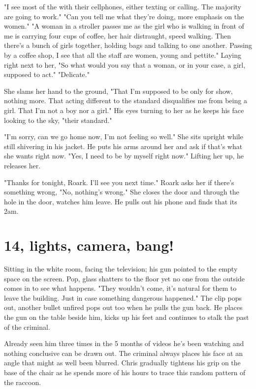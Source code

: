        "I see most of the with their cellphones, either texting or calling. The majority are going to work." "Can you tell me what they're doing,
    more emphasis on the women." "A woman in a stroller passes me as the girl who is walking in front of me is carrying four cups of coffee,
    her hair distraught, speed walking. Then there's a bunch of girls together, holding bags and talking to one another. Passing by a coffee
    shop, I see that all the staff are women, young and pettite." Laying right next to her, "So what would you say that a woman, or in your
    case, a girl, supposed to act." "Delicate." 

        She slams her hand to the ground, "That I'm supposed to be only for show, nothing more. That acting different to the standard
    disqualifies me from being a girl. That I'm not a boy nor a girl." His eyes turning to her as he keeps his face looking to the sky, "their
    standard."

        "I'm sorry, can we go home now, I'm not feeling so well." She sits upright while still shivering in his jacket. He puts his arms around
    her and ask if that's what she wants right now. "Yes, I need to be by myself right now." Lifting her up, he releases her.

        "Thanks for tonight, Roark. I'll see you next time." Roark asks her if there's something wrong, "No, nothing's wrong." She closes the 
    door and through the hole in the door, watches him leave. He pulls out his phone and finds that its 2am. 

\section{14, lights, camera, bang!}

        Sitting in the white room, facing the television; his gun pointed to the empty space on the screen. Pop, glass shatters to the floor yet
    no one from the outside comes in to see what happens. "They wouldn't come, it's natural for them to leave the building. Just in case 
    something dangerous happened." The clip pops out, another bullet unfired pops out too when he pulls the gun back. He places the gun on the
    table beside him, kicks up his feet and continues to stalk the past of the criminal.

        Already seen him three times in the 5 months of videos he's been watching and nothing conclusive can be drawn out. The criminal always
    places his face at an angle that might as well been blurred. Chris gradually tightens his grip on the base of the chair as he spends more
    of his hours to trace this random pattern of the raccoon. 

